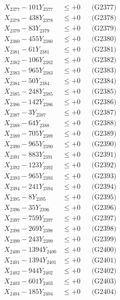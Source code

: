 \documentclass[a4paper,10pt]{article}
\begin{document}
{\begin{align}
X_{2377} - 101Y_{2377} &\leq +0 && \text{(G2377)} \\
X_{2378} - 438Y_{2378} &\leq +0 && \text{(G2378)} \\
X_{2379} - 83Y_{2379} &\leq +0 && \text{(G2379)} \\
X_{2380} - 455Y_{2380} &\leq +0 && \text{(G2380)} \\
\allowbreak
X_{2381} - 61Y_{2381} &\leq +0 && \text{(G2381)} \\
X_{2382} - 106Y_{2382} &\leq +0 && \text{(G2382)} \\
X_{2383} - 965Y_{2383} &\leq +0 && \text{(G2383)} \\
X_{2384} - 50Y_{2384} &\leq +0 && \text{(G2384)} \\
X_{2385} - 248Y_{2385} &\leq +0 && \text{(G2385)} \\
X_{2386} - 142Y_{2386} &\leq +0 && \text{(G2386)} \\
X_{2387} - 3Y_{2387} &\leq +0 && \text{(G2387)} \\
X_{2388} - 64Y_{2388} &\leq +0 && \text{(G2388)} \\
X_{2389} - 705Y_{2389} &\leq +0 && \text{(G2389)} \\
X_{2390} - 965Y_{2390} &\leq +0 && \text{(G2390)} \\
\allowbreak
X_{2391} - 883Y_{2391} &\leq +0 && \text{(G2391)} \\
X_{2392} - 123Y_{2392} &\leq +0 && \text{(G2392)} \\
X_{2393} - 965Y_{2393} &\leq +0 && \text{(G2393)} \\
X_{2394} - 241Y_{2394} &\leq +0 && \text{(G2394)} \\
X_{2395} - 8Y_{2395} &\leq +0 && \text{(G2395)} \\
X_{2396} - 35Y_{2396} &\leq +0 && \text{(G2396)} \\
X_{2397} - 759Y_{2397} &\leq +0 && \text{(G2397)} \\
X_{2398} - 269Y_{2398} &\leq +0 && \text{(G2398)} \\
X_{2399} - 243Y_{2399} &\leq +0 && \text{(G2399)} \\
X_{2400} - 1394Y_{2400} &\leq +0 && \text{(G2400)} \\
\allowbreak
X_{2401} - 1394Y_{2401} &\leq +0 && \text{(G2401)} \\
X_{2402} - 944Y_{2402} &\leq +0 && \text{(G2402)} \\
X_{2403} - 601Y_{2403} &\leq +0 && \text{(G2403)} \\
X_{2404} - 185Y_{2404} &\leq +0 && \text{(G2404)} \\

\end{align}}
\end{document}
